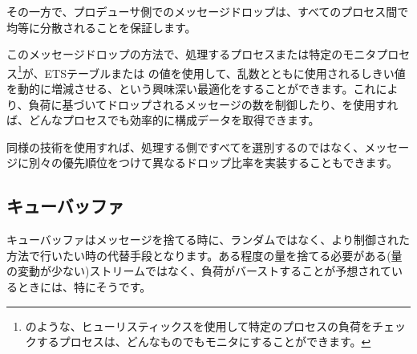 その一方で、プロデューサ側でのメッセージドロップは、すべてのプロセス間で均等に分散されることを保証します。

このメッセージドロップの方法で、処理するプロセスまたは特定のモニタプロセス\footnote{のような、ヒューリスティックスを使用して特定のプロセスの負荷をチェックするプロセスは、どんなものでもモニタにすることができます。}が、ETSテーブルまたは  の値を使用して、乱数とともに使用されるしきい値を動的に増減させる、という興味深い最適化をすることができます。これにより、負荷に基づいてドロップされるメッセージの数を制御したり、を使用すれば、どんなプロセスでも効率的に構成データを取得できます。

同様の技術を使用すれば、処理する側ですべてを選別するのではなく、メッセージに別々の優先順位をつけて異なるドロップ比率を実装することもできます。

\subsection{キューバッファ}

キューバッファはメッセージを捨てる時に、ランダムではなく、より制御された方法で行いたい時の代替手段となります。ある程度の量を捨てる必要がある(量の変動が少ない)ストリームではなく、負荷がバーストすることが予想されているときには、特にそうです。

